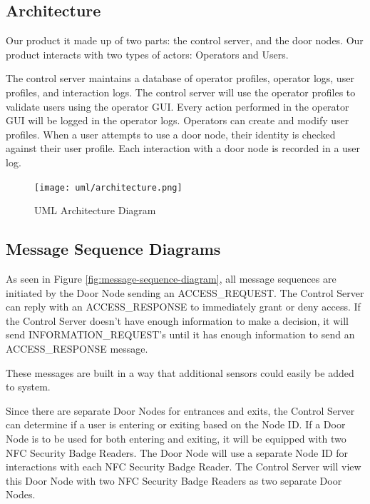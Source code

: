\subsection{Architecture}

Our product it made up of two parts: the control server, and the door nodes.
Our product interacts with two types of actors: Operators and Users.

The control server maintains a database of operator profiles, operator logs,
user profiles, and interaction logs.  The control server will use the operator
profiles to validate users using the operator GUI.  Every action performed in
the operator GUI will be logged in the operator logs.  Operators can create and
modify user profiles.  When a user attempts to use a door node, their identity
is checked against their user profile.  Each interaction with a door node is
recorded in a user log.

\begin{figure}[!htb]
\centering
\texttt{[image: uml/architecture.png]}
\caption{UML Architecture Diagram}
\label{fig:architecture-diagram}
\end{figure}

\subsection{Message Sequence Diagrams}

As seen in Figure \ref{fig:message-sequence-diagram}, all message sequences are
initiated by the Door Node sending an ACCESS\_REQUEST.  The Control Server can
reply with an ACCESS\_RESPONSE to immediately grant or deny access.  If the
Control Server doesn't have enough information to make a decision, it will send
INFORMATION\_REQUEST's until it has enough information to send an
ACCESS\_RESPONSE message.

These messages are built in a way that additional sensors could easily be added
to system.

Since there are separate Door Nodes for entrances and exits, the Control Server
can determine if a user is entering or exiting based on the Node ID.  If a Door
Node is to be used for both entering and exiting, it will be equipped with two
NFC Security Badge Readers.  The Door Node will use a separate Node ID for
interactions with each NFC Security Badge Reader.  The Control Server will view
this Door Node with two NFC Security Badge Readers as two separate Door Nodes.

